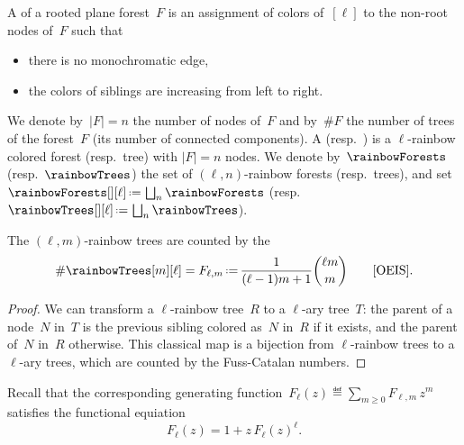 \begin{definition}
\label{def:rainbowForest}
A  of a rooted plane forest~$F$ is an assignment of colors of~$[\ell]$ to the non-root nodes of~$F$ such that
\begin{itemize}
\item there is no monochromatic edge,
\item the colors of siblings are increasing from left to right.
\end{itemize}
We denote by~$|F| = n$ the number of nodes of~$F$ and by~$\#F$ the number of trees of the forest~$F$ (\ie its number of connected components).
A  (resp.~) is a $\ell$-rainbow colored forest (resp.~tree) with $|F| = n$ nodes.
We denote by~$\rainbowForests$ (resp.~$\rainbowTrees$) the set of $(\ell,n)$-rainbow forests (resp.~trees), and set~$\rainbowForests[][\ell] \eqdef \bigsqcup_n \rainbowForests$ (resp.~$\rainbowTrees[][\ell] \eqdef \bigsqcup_n \rainbowTrees$).
\end{definition}

\begin{lemma}
\label{lem:FussCatalan}
The $(\ell,m)$-rainbow trees are counted by the 
\[
\# \rainbowTrees[m][\ell] = F_{\ell,m} \eqdef \frac{1}{(\ell-1)m+1} \binom{\ell m}{m} \qquad \text{\OEIS{A062993}}.
\]
\end{lemma}

\begin{proof}
We can transform a $\ell$-rainbow tree~$R$ to a $\ell$-ary tree~$T$: the parent of a node~$N$ in~$T$ is the previous sibling colored as~$N$ in~$R$ if it exists, and the parent of~$N$ in~$R$ otherwise.
This classical map is a bijection from $\ell$-rainbow trees to a $\ell$-ary trees, which are counted by the Fuss-Catalan numbers.
\end{proof}

\begin{remark}
\label{rem:functionalEquationFussCatalan}
Recall that the corresponding generating function~$F_\ell(z) \eqdef \sum_{m \ge 0} F_{\ell,m} \, z^m$ satisfies the functional equiation
\[
F_\ell(z) = 1 + z \, F_\ell(z)^\ell.
\]
\end{remark}


